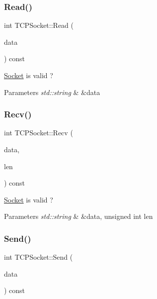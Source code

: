 \subsubsection{\texorpdfstring{Read()}{Read()}}
{\footnotesize\ttfamily int T\+C\+P\+Socket\+::\+Read (\begin{DoxyParamCaption}\item[{std\+::string \&}]{data }\end{DoxyParamCaption}) const}



\hyperlink{class_socket}{Socket} is valid ? 


\begin{DoxyParams}{Parameters}
{\em std\+::string} & \&data \\
\hline
\end{DoxyParams}
\mbox{\label{class_t_c_p_socket_a120e18e534e4cabcd7a947302517b174}} 
\subsubsection{\texorpdfstring{Recv()}{Recv()}}
{\footnotesize\ttfamily int T\+C\+P\+Socket\+::\+Recv (\begin{DoxyParamCaption}\item[{std\+::string \&}]{data,  }\item[{unsigned int}]{len }\end{DoxyParamCaption}) const}



\hyperlink{class_socket}{Socket} is valid ? 


\begin{DoxyParams}{Parameters}
{\em std\+::string} & \&data, unsigned int len \\
\hline
\end{DoxyParams}
\mbox{\label{class_t_c_p_socket_aaf5b33093a15e670da96eed106b953a0}} 
\subsubsection{\texorpdfstring{Send()}{Send()}}
{\footnotesize\ttfamily int T\+C\+P\+Socket\+::\+Send (\begin{DoxyParamCaption}\item[{const std\+::string}]{data }\end{DoxyParamCaption}) const}



